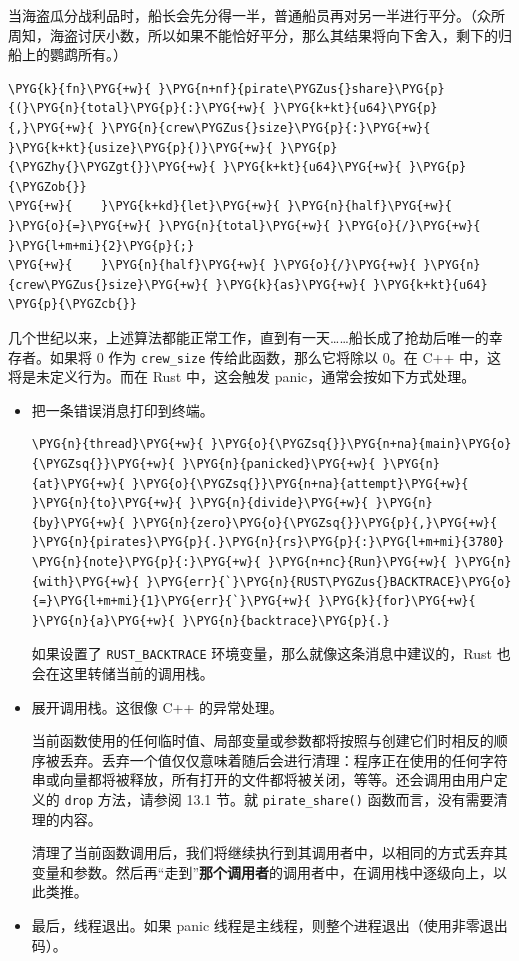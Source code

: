 当海盗瓜分战利品时，船长会先分得一半，普通船员再对另一半进行平分。（众所周知，海盗讨厌小数，所以如果不能恰好平分，那么其结果将向下舍入，剩下的归船上的鹦鹉所有。）

\begin{Verbatim}[commandchars=\\\{\},breaklines=true,breakanywhere=true,fontsize=\codefont,xleftmargin=17bp]
\PYG{k}{fn}\PYG{+w}{ }\PYG{n+nf}{pirate\PYGZus{}share}\PYG{p}{(}\PYG{n}{total}\PYG{p}{:}\PYG{+w}{ }\PYG{k+kt}{u64}\PYG{p}{,}\PYG{+w}{ }\PYG{n}{crew\PYGZus{}size}\PYG{p}{:}\PYG{+w}{ }\PYG{k+kt}{usize}\PYG{p}{)}\PYG{+w}{ }\PYG{p}{\PYGZhy{}\PYGZgt{}}\PYG{+w}{ }\PYG{k+kt}{u64}\PYG{+w}{ }\PYG{p}{\PYGZob{}}
\PYG{+w}{    }\PYG{k+kd}{let}\PYG{+w}{ }\PYG{n}{half}\PYG{+w}{ }\PYG{o}{=}\PYG{+w}{ }\PYG{n}{total}\PYG{+w}{ }\PYG{o}{/}\PYG{+w}{ }\PYG{l+m+mi}{2}\PYG{p}{;}
\PYG{+w}{    }\PYG{n}{half}\PYG{+w}{ }\PYG{o}{/}\PYG{+w}{ }\PYG{n}{crew\PYGZus{}size}\PYG{+w}{ }\PYG{k}{as}\PYG{+w}{ }\PYG{k+kt}{u64}
\PYG{p}{\PYGZcb{}}
\end{Verbatim}

几个世纪以来，上述算法都能正常工作，直到有一天……船长成了抢劫后唯一的幸存者。如果将 0 作为 \texttt{crew\_size} 传给此函数，那么它将除以 0。在 C++ 中，这将是未定义行为。而在 Rust 中，这会触发 panic，通常会按如下方式处理。

\begin{itemize}
\item 把一条错误消息打印到终端。

\begin{Verbatim}[commandchars=\\\{\},breaklines=true,breakanywhere=true,fontsize=\codefont,xleftmargin=17bp]
\PYG{n}{thread}\PYG{+w}{ }\PYG{o}{\PYGZsq{}}\PYG{n+na}{main}\PYG{o}{\PYGZsq{}}\PYG{+w}{ }\PYG{n}{panicked}\PYG{+w}{ }\PYG{n}{at}\PYG{+w}{ }\PYG{o}{\PYGZsq{}}\PYG{n+na}{attempt}\PYG{+w}{ }\PYG{n}{to}\PYG{+w}{ }\PYG{n}{divide}\PYG{+w}{ }\PYG{n}{by}\PYG{+w}{ }\PYG{n}{zero}\PYG{o}{\PYGZsq{}}\PYG{p}{,}\PYG{+w}{ }\PYG{n}{pirates}\PYG{p}{.}\PYG{n}{rs}\PYG{p}{:}\PYG{l+m+mi}{3780}
\PYG{n}{note}\PYG{p}{:}\PYG{+w}{ }\PYG{n+nc}{Run}\PYG{+w}{ }\PYG{n}{with}\PYG{+w}{ }\PYG{err}{`}\PYG{n}{RUST\PYGZus{}BACKTRACE}\PYG{o}{=}\PYG{l+m+mi}{1}\PYG{err}{`}\PYG{+w}{ }\PYG{k}{for}\PYG{+w}{ }\PYG{n}{a}\PYG{+w}{ }\PYG{n}{backtrace}\PYG{p}{.}
\end{Verbatim}

如果设置了 \texttt{RUST\_BACKTRACE} 环境变量，那么就像这条消息中建议的，Rust 也会在这里转储当前的调用栈。
\item 展开调用栈。这很像 C++ 的异常处理。

当前函数使用的任何临时值、局部变量或参数都将按照与创建它们时相反的顺序被丢弃。丢弃一个值仅仅意味着随后会进行清理：程序正在使用的任何字符串或向量都将被释放，所有打开的文件都将被关闭，等等。还会调用由用户定义的 \texttt{drop} 方法，请参阅 13.1 节。就 \texttt{pirate\_share()} 函数而言，没有需要清理的内容。

清理了当前函数调用后，我们将继续执行到其调用者中，以相同的方式丢弃其变量和参数。然后再“走到”\textbf{那个调用者}的调用者中，在调用栈中逐级向上，以此类推。
\item 最后，线程退出。如果 panic 线程是主线程，则整个进程退出（使用非零退出码）。
\end{itemize}

